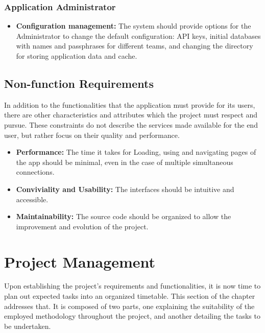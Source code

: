 \subsubsection{Application Administrator}
\begin{itemize}
    \item \textbf{Configuration management:} The system should provide options for the Administrator to change the default configuration: API keys, initial databases with names and passphrases for different teams, and changing the directory for storing application data and cache.
\end{itemize}
\subsection{Non-function Requirements}
In addition to the functionalities that the application must provide for its users, there are other characteristics and attributes which the project must respect and pursue. These constraints do not describe the services made available for the end user, but rather focus on their quality and performance.
\begin{itemize}
    \item \textbf{Performance:} The time it takes for Loading, using and navigating pages of the app should be minimal, even in the case of multiple simultaneous connections.
    \item \textbf{Conviviality and Usability:} The interfaces should be intuitive and accessible.
    \item \textbf{Maintainability:} The source code should be organized to allow the improvement and evolution of the project.
\end{itemize}

\section{Project Management}
Upon establishing the project's requirements and functionalities, it is now time to plan out expected tasks into an organized timetable. This section of the chapter addresses that. It is composed of two parts, one explaining the suitability of the employed methodology throughout the project, and another detailing the tasks to be undertaken.

